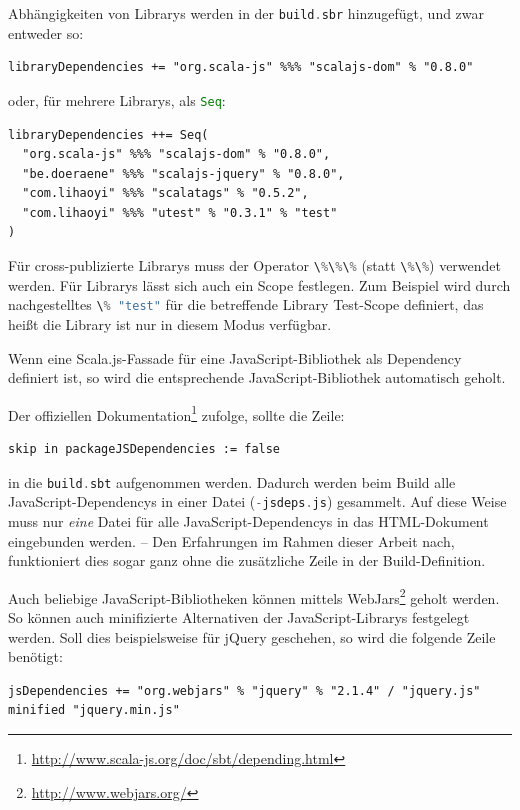 \documentclass[a4paper, 12pt, hidelinks, listof=totoc, listoftables=totoc, bibliography=totoc]{scrreprt}
\newcommand{\code}[1]{\lstinline[language=Scala, style=inline]|#1|}
\begin{document}
Abhängigkeiten von Librarys werden in der \code{build.sbr} hinzugefügt, und zwar entweder so:

\begin{lstlisting}[style=snippet]
libraryDependencies += "org.scala-js" %%% "scalajs-dom" % "0.8.0"
\end{lstlisting}

oder, für mehrere Librarys, als \code{Seq}:

\begin{lstlisting}[style=snippet]
libraryDependencies ++= Seq(
  "org.scala-js" %%% "scalajs-dom" % "0.8.0",
  "be.doeraene" %%% "scalajs-jquery" % "0.8.0",
  "com.lihaoyi" %%% "scalatags" % "0.5.2",
  "com.lihaoyi" %%% "utest" % "0.3.1" % "test"
)
\end{lstlisting}

Für cross-publizierte Librarys muss der Operator \code{\%\%\%} (statt \code{\%\%}) verwendet werden. Für Librarys lässt sich auch ein Scope festlegen. Zum Beispiel wird durch nachgestelltes \code{\% "test"} für die betreffende Library Test-Scope definiert, das heißt die Library ist nur in diesem Modus verfügbar.

Wenn eine Scala.js-Fassade für eine JavaScript-Bibliothek als Dependency definiert ist, so wird die entsprechende JavaScript-Bibliothek automatisch geholt.

Der offiziellen Dokumentation\footnote{ \url{http://www.scala-js.org/doc/sbt/depending.html}} zufolge, sollte die Zeile:

\begin{lstlisting}[style=snippet]
skip in packageJSDependencies := false
\end{lstlisting}

in die \code{build.sbt} aufgenommen werden. Dadurch werden beim Build alle JavaScript-Dependencys in einer Datei (\code{-jsdeps.js}) gesammelt. Auf diese Weise muss nur \emph{eine} Datei für alle JavaScript-Dependencys in das \ac{HTML}-Dokument eingebunden werden. -- Den Erfahrungen im Rahmen dieser Arbeit nach, funktioniert dies sogar ganz ohne die zusätzliche Zeile in der Build-Definition.

Auch beliebige JavaScript-Bibliotheken können mittels WebJars\footnote{\url{http://www.webjars.org/}} geholt werden. So können auch minifizierte Alternativen der JavaScript-Librarys festgelegt werden. Soll dies beispielsweise für jQuery geschehen, so wird die folgende Zeile benötigt:

\begin{lstlisting}[style=snippet]
jsDependencies += "org.webjars" % "jquery" % "2.1.4" / "jquery.js" minified "jquery.min.js"
\end{lstlisting}
\end{document}
